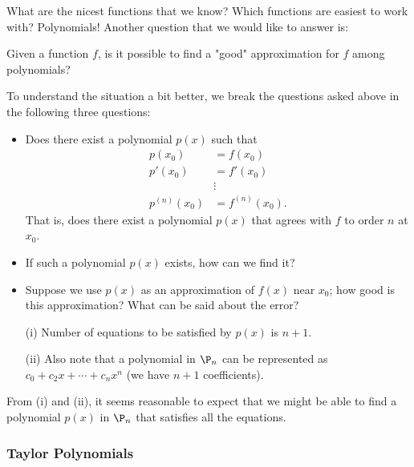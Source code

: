 What are the nicest functions that we know? Which functions are easiest to work with? Polynomials! Another question that we would like to answer is:
\begin{center}
    Given a function \( f \), is it possible to find a "good" approximation for \( f  \) among polynomials?
\end{center}

To understand the situation a bit better, we break the questions asked above in the following three questions:
\begin{itemize}
    \item Does there exist a polynomial \( p(x) \) such that 
        \begin{align*}
            p({x}_{0}) &= f({x}_{0}) \\
            p'({x}_{0}) &= f'({x}_{0}) \\
                        &\vdots \\
            p^{(n)}({x}_{0}) &= f^{(n)}({x}_{0}).
        \end{align*}
        That is, does there exist a polynomial \( p(x) \) that agrees with \( f  \) to order \( n  \) at \( {x}_{0} \).
    \item If such a polynomial \( p(x) \) exists, how can we find it? 
    \item Suppose we use \( p(x) \) as an approximation of \( f(x) \) near \( {x}_{0}  \); how good is this approximation? What can be said about the error?  
\end{itemize}

\begin{remark}
    \begin{enumerate}
        \item[(i)] Number of equations to be satisfied by \( p(x) \) is \( n + 1  \).
        \item[(ii)] Also note that a polynomial in \( {\P}_{n} \) can be represented as \( {c}_{0} + {c}_{2} x + \cdots + {c}_{n} x^{n} \) (we have \( n + 1  \) coefficients).  
    \end{enumerate}
    From (i) and (ii), it seems reasonable to expect that we might be able to find a polynomial \( p(x) \) in \( {\P}_{n} \) that satisfies all the equations. 
\end{remark}

\subsubsection{Taylor Polynomials}\label{Taylor Polynomials}

